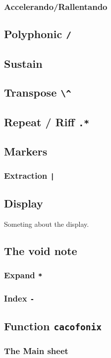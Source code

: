 \documentclass{article}
\begin{document}
\subsubsection{Accelerando/Rallentando}

\subsection{Polyphonic \lstinline!/!}

\subsection{Sustain}

\subsection{Transpose \lstinline!\^!}

\subsection{Repeat / Riff \lstinline!.*!}
\label{sec:RepeatRiff}

\subsection{Markers}
\subsubsection{Extraction \lstinline!|!}

\subsection{Display}

Someting about the display.

\subsection{The void note}


\subsubsection{Expand \lstinline!*!}
\label{sec:Expand}

\subsubsection{Index \lstinline!-!}

\subsection{Function \lstinline!cacofonix!}
\subsubsection{The Main sheet}
\label{sec:MainSheet}
\end{document}

